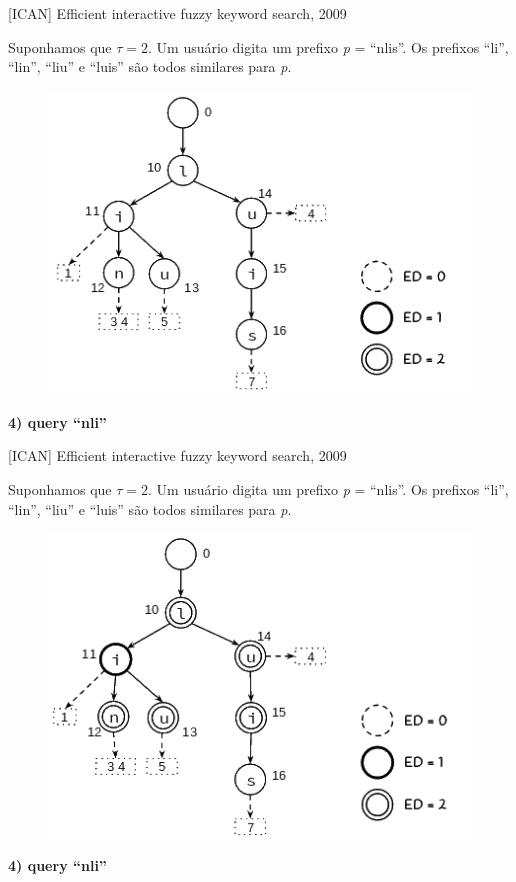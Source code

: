 \documentclass[11pt]{beamer}
\begin{document}
\begin{frame}{[ICAN] Efficient interactive fuzzy keyword search, 2009}

    \small
    Suponhamos que $\tau = 2$. Um usuário digita um prefixo \textit{p} = ``nlis''. Os prefixos ``li'', ``lin'', ``liu'' e ``luis'' são todos similares para \textit{p}.
    
    \begin{figure}
      \includegraphics[scale=0.45]{pictures/ican_default.png}
      \centering
    \end{figure}
    
    \textbf{4) query ``nli''}
    
\end{frame}

\begin{frame}{[ICAN] Efficient interactive fuzzy keyword search, 2009}

    \small
    Suponhamos que $\tau = 2$. Um usuário digita um prefixo \textit{p} = ``nlis''. Os prefixos ``li'', ``lin'', ``liu'' e ``luis'' são todos similares para \textit{p}.
    
    \begin{figure}
      \includegraphics[scale=0.45]{pictures/ican_5.png}
      \centering
    \end{figure}
    
    \textbf{4) query ``nli''}
    
\end{frame}
\end{document}
